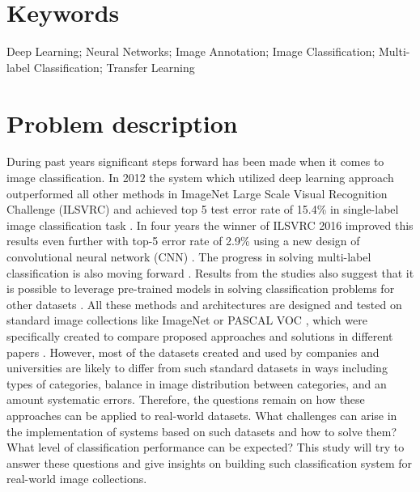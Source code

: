 \section{Keywords}
Deep Learning; Neural Networks; Image Annotation; Image Classification; Multi-label Classification; Transfer Learning

\section{Problem description}
During past years significant steps forward has been made when it comes to image classification. In 2012 the system which utilized deep learning approach outperformed all other methods in ImageNet Large Scale Visual Recognition Challenge (ILSVRC) and achieved top 5 test error rate of 15.4\% in single-label image classification task \cite{Krizhevsky2012ImageNetDNN, Russakovsky2015ImageNet}. In four years the winner of ILSVRC 2016 improved this results even further with top-5 error rate of 2.9\% using a new design of convolutional neural network (CNN) \cite{StanfordUniversity2016}. The progress in solving multi-label classification is also moving forward \cite{Ren2016, Wei2016HCP}. Results from the studies also suggest that it is possible to leverage pre-trained models in solving classification problems for other datasets \cite{Yosinski2014HowTransferable, Oquab2014TransferringMidLevel}. All these methods and architectures are designed and tested on standard image collections like ImageNet \cite{Russakovsky2015ImageNet} or PASCAL VOC \cite{Everingham2010PASCAL-VOC}, which were specifically created to compare proposed approaches and solutions in different papers \cite{Wei2016HCP, Gong2013DeepRanking, Oquab2014TransferringMidLevel, Chatfield2014ReturnDevilInTheDetails}. However, most of the datasets created and used by companies and universities are likely to differ from such standard datasets in ways including types of categories, balance in image distribution between categories, and an amount systematic errors. Therefore, the questions remain on how these approaches can be applied to real-world datasets. What challenges can arise in the implementation of systems based on such datasets and how to solve them? What level of classification performance can be expected? This study will try to answer these questions and give insights on building such classification system for real-world image collections.

